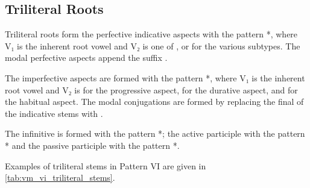 \documentclass[grammar]{subfiles}
\begin{document}

\subsection{Triliteral Roots}
\label{ssec:vm_vi_triliteral_roots}

Triliteral roots form the perfective indicative aspects with the pattern
*, where V₁ is the inherent root vowel and V₂ is one of
,  or  for the various subtypes.  The modal perfective
aspects append the suffix . 

The imperfective aspects are formed with the pattern *,
where V₁ is the inherent root vowel and V₂ is  for the progressive
aspect,  for the durative aspect, and  for the habitual aspect.
The modal conjugations are formed by replacing the final  of the
indicative stems with . 

The infinitive is formed with the pattern *; the active participle
with the pattern * and the passive participle with the pattern
*. 

Examples of triliteral stems in Pattern VI are given in \cref{tab:vm_vi_triliteral_stems}. 
\end{document}
